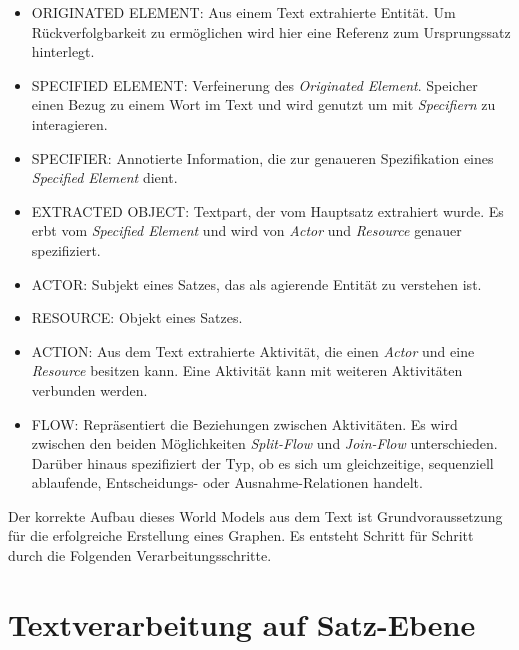 \begin{itemize} 
\item ORIGINATED ELEMENT: Aus einem Text extrahierte Entität. Um Rückverfolgbarkeit zu ermöglichen wird hier eine Referenz zum Ursprungssatz hinterlegt.
\item SPECIFIED ELEMENT: Verfeinerung des \textit{Originated Element}. Speicher einen Bezug zu einem Wort im Text und wird genutzt um mit \textit{Specifiern} zu interagieren.
\item SPECIFIER: Annotierte Information, die zur genaueren Spezifikation eines \textit{Specified Element} dient.
\item EXTRACTED OBJECT: Textpart, der vom Hauptsatz extrahiert wurde. Es erbt vom \textit{Specified Element} und wird  von \textit{Actor} und \textit{Resource} genauer spezifiziert.
\item ACTOR: Subjekt eines Satzes, das als agierende Entität zu verstehen ist. 
\item RESOURCE: Objekt eines Satzes.
\item ACTION: Aus dem Text extrahierte Aktivität, die einen \textit{Actor} und eine \textit{Resource} besitzen kann. Eine Aktivität kann mit weiteren Aktivitäten verbunden werden.
\item FLOW: Repräsentiert die Beziehungen zwischen Aktivitäten. Es wird zwischen den beiden Möglichkeiten \textit{Split-Flow} und \textit{Join-Flow} unterschieden. Darüber hinaus spezifiziert der Typ, ob es sich um gleichzeitige, sequenziell ablaufende, Entscheidungs- oder Ausnahme-Relationen handelt.
\end{itemize}

Der korrekte Aufbau dieses World Models aus dem Text ist Grundvoraussetzung für die erfolgreiche Erstellung eines Graphen. Es entsteht Schritt für Schritt durch die Folgenden Verarbeitungsschritte.

\section{Textverarbeitung auf Satz-Ebene}


